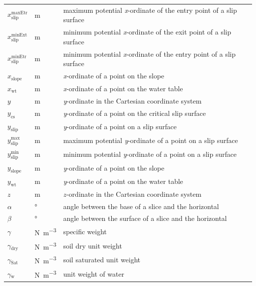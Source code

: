 \documentclass[12pt]{article}
\begin{document}
\begin{longtable*}{  l  l  p{8.5cm}  }
\\
${x_{\text{slip}}^{\text{maxEtr}}}$ &  \si{\meter}& maximum potential 
\textit{x}-ordinate 
of the entry point of a slip surface
\\
${x_{\text{slip}}^{\text{minExt}}}$ &  \si{\meter}& minimum potential 
\textit{x}-ordinate of 
the exit point of a slip surface
\\
${x_{\text{slip}}^{\text{minEtr}}}$ &  \si{\meter}& minimum potential 
\textit{x}-ordinate 
of the entry point of a slip surface
\\
${x_{\text{slope}}}$ &  \si{\meter}& \textit{x}-ordinate of a point on the slope
\\
${x_{\text{wt}}}$ & \si{\meter} & \textit{x}-ordinate of a point on the water 
table
\\
$y$ &  \si{\meter}& \textit{y}-ordinate in the Cartesian coordinate system
\\
$y_{\text{cs}}$ & \si{\meter} & \textit{y}-ordinate of a point on the critical 
slip 
surface
\\
${y_{\text{slip}}}$ & \si{\meter}& \textit{y}-ordinate of a point on a slip 
surface
\\
${y_{\text{slip}}^{\text{max}}}$ &  \si{\meter}& maximum potential 
\textit{y}-ordinate of a point on a slip surface
\\
${y_{\text{slip}}^{\text{min}}}$ &  \si{\meter}& minimum potential 
\textit{y}-ordinate of a point on a slip surface
\\
${y_{\text{slope}}}$ &  \si{\meter}& \textit{y}-ordinate of a point on the 
slope 
\\
${y_{\text{wt}}}$ &  \si{\meter}& \textit{y}-ordinate of a point on the water 
table
\\
$z$ & \si{\meter} & $z$-ordinate in the Cartesian coordinate system
\\
$\alpha{}$ & \si{\degree} & angle between the base of a slice and the horizontal
\\
$\beta{}$ &\si{\degree} & angle between the surface of a slice and the 
horizontal
\\
$\gamma$ & \si{\newton\per\cubic\meter} & specific weight
\\
$\gamma{}_{\text{dry}}$ & \si{\newton\per\cubic\meter} & soil dry unit weight
\\
${\gamma{}_{\text{Sat}}}$ &  \si{\newton\per\cubic\meter} & soil saturated unit 
weight
\\
${\gamma{}_{\text{w}}}$ & \si{\newton\per\cubic\meter} & unit weight of water
\\

\end{longtable*}
\end{document}
